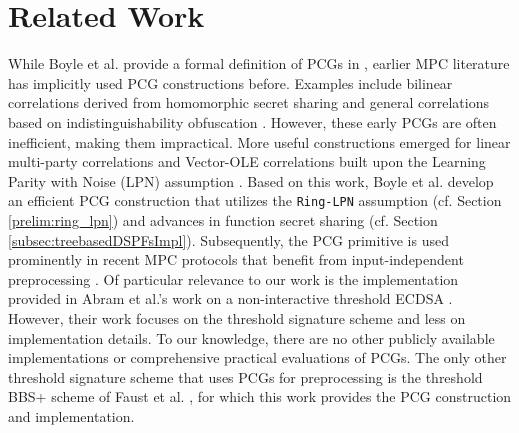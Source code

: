 \section{Related Work}
While Boyle et al. provide a formal definition of PCGs in \cite{boyle2019efficient}, earlier MPC literature has implicitly used PCG constructions before. Examples include bilinear correlations derived from homomorphic secret sharing \cite{boyle2017homomorphic} and general correlations based on indistinguishability obfuscation \cite{halevi2016secure}. However, these early PCGs are often inefficient, making them impractical. More useful constructions emerged for linear multi-party correlations \cite{cramer2005share, gilboa1999compressing} and Vector-OLE correlations built upon the Learning Parity with Noise (LPN) assumption \cite{boyle2018compressingVole, schoppmann2019distributedVole}. Based on this work, Boyle et al. develop an efficient PCG construction \cite{boyle2019efficient, boyle2020efficient} that utilizes the \texttt{Ring-LPN} assumption (cf. Section \ref{prelim:ring_lpn}) and advances in function secret sharing \cite{boyle2015function, boyle2016function} (cf. Section \ref{subsec:treebasedDSPFsImpl}). Subsequently, the PCG primitive is used prominently in recent MPC protocols that benefit from input-independent preprocessing \cite{bui2022private, abram2022low, wagh2022barnowl, dittmer2022authenticated, faust2023non, kondi2023two, bui2023improved}.  Of particular relevance to our work is the implementation provided in Abram et al.'s work on a non-interactive threshold ECDSA \cite{abram2022low}. However, their work focuses on the threshold signature scheme and less on implementation details. To our knowledge, there are no other publicly available implementations or comprehensive practical evaluations of PCGs. The only other threshold signature scheme that uses PCGs for preprocessing is the threshold BBS+ scheme of Faust et al. \cite{faust2023non}, for which this work provides the PCG construction and implementation.
